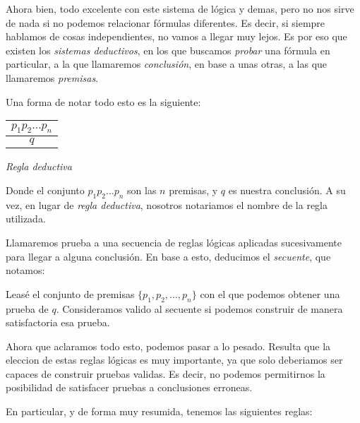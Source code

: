 \documentclass{article}
\begin{document}
Ahora bien, todo excelente con este sistema de lógica y demas, pero no nos sirve de nada si no podemos relacionar fórmulas diferentes. Es decir, si siempre hablamos de cosas independientes, no vamos a llegar muy lejos. Es por eso que existen los \textit{sistemas deductivos}, en los que buscamos \textit{probar} una fórmula en particular, a la que llamaremos \textit{conclusión}, en base a unas otras, a las que llamaremos \textit{premisas}.

Una forma de notar todo esto es la siguiente:

\begin{center}
\begin{tabular}{c}
	
	$p_{1} p_{2} \ldots p_{n}$\\
	\hline
	$q$\\

\end{tabular}
\textit{Regla deductiva}

\end{center}

Donde el conjunto $p_{1} p_{2} \ldots p_{n}$ son las $n$ premisas, y $q$ es nuestra conclusión. A su vez, en lugar de \textit{regla deductiva}, nosotros notariamos el nombre de la regla utilizada.

Llamaremos prueba a una secuencia de reglas lógicas aplicadas sucesivamente para llegar a alguna conclusión. En base a esto, deducimos el \textit{secuente}, que notamos:


Leasé el conjunto de premisas $\{ p_{1},p_{2}, \ldots, p_{n} \}$ con el que podemos obtener una prueba de $q$. Consideramos valido al secuente si podemos construir de manera satisfactoria esa prueba.

Ahora que aclaramos todo esto, podemos pasar a lo pesado. Resulta que la eleccion de estas reglas lógicas es muy importante, ya que solo deberiamos ser capaces de construir pruebas validas. Es decir, no podemos permitirnos la posibilidad de satisfacer pruebas a conclusiones erroneas.

En particular, y de forma muy resumida, tenemos las siguientes reglas:
\end{document}
